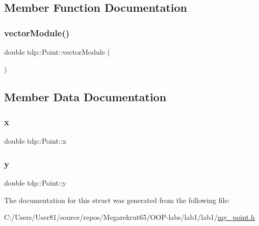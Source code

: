 \subsection{Member Function Documentation}
\mbox{\label{structtdp_1_1_point_a66681cb3fb742ab9dbe355c0784b8242}} 
\subsubsection{\texorpdfstring{vector\+Module()}{vectorModule()}}
{\footnotesize\ttfamily double tdp\+::\+Point\+::vector\+Module (\begin{DoxyParamCaption}{ }\end{DoxyParamCaption})}



\subsection{Member Data Documentation}
\mbox{\label{structtdp_1_1_point_a31898184708346947177896af4c7eac6}} 
\subsubsection{\texorpdfstring{x}{x}}
{\footnotesize\ttfamily double tdp\+::\+Point\+::x}

\mbox{\label{structtdp_1_1_point_af46e9a346f374660a675336c2e619a69}} 
\subsubsection{\texorpdfstring{y}{y}}
{\footnotesize\ttfamily double tdp\+::\+Point\+::y}



The documentation for this struct was generated from the following file\+:\begin{DoxyCompactItemize}
\item 
C\+:/\+Users/\+User81/source/repos/\+Megarekrut65/\+O\+O\+P-\/labs/lab1/lab1/\mbox{\hyperlink{my__point_8h}{my\+\_\+point.\+h}}\end{DoxyCompactItemize}
